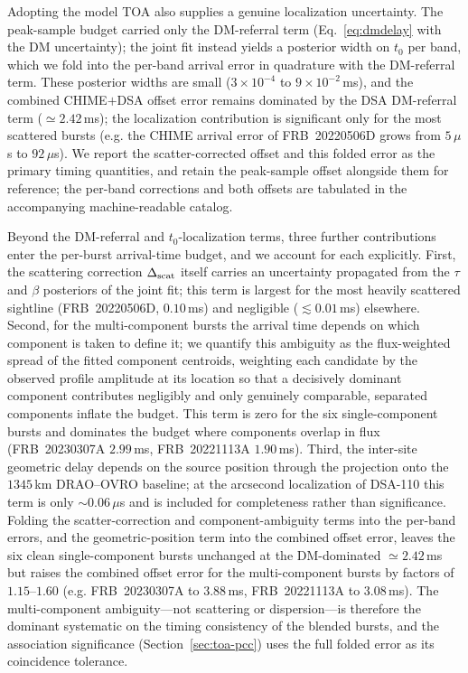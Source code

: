 Adopting the model TOA also supplies a genuine localization uncertainty. The
peak-sample budget carried only the DM-referral term
(Eq.~\ref{eq:dmdelay} with the DM uncertainty); the joint fit instead yields a
posterior width on $t_0$ per band, which we fold into the per-band arrival error
in quadrature with the DM-referral term. These posterior widths are small
($3\times10^{-4}$ to $9\times10^{-2}$\,ms), and the combined CHIME$+$DSA offset
error remains dominated by the DSA DM-referral term ($\simeq2.42$\,ms); the
localization contribution is significant only for the most scattered bursts
(e.g. the CHIME arrival error of FRB~20220506D grows from $5\,\mu$s to
$92\,\mu$s). We report the scatter-corrected offset and this folded error as
the primary timing quantities, and retain the peak-sample offset alongside them
for reference; the per-band corrections and both offsets are tabulated in the
accompanying machine-readable catalog.

Beyond the DM-referral and $t_0$-localization terms, three further
contributions enter the per-burst arrival-time budget, and we account for each
explicitly. First, the scattering correction $\Delta_{\rm scat}$ itself carries
an uncertainty propagated from the $\tau$ and $\beta$ posteriors of the joint
fit; this term is largest for the most heavily scattered sightline
(FRB~20220506D, $0.10$\,ms) and negligible ($\lesssim0.01$\,ms) elsewhere.
Second, for the multi-component bursts the arrival time depends on which
component is taken to define it; we quantify this ambiguity as the flux-weighted
spread of the fitted component centroids, weighting each candidate by the
observed profile amplitude at its location so that a decisively dominant
component contributes negligibly and only genuinely comparable, separated
components inflate the budget. This term is zero for the six single-component
bursts and dominates the budget where components overlap in flux
(FRB~20230307A $2.99$\,ms, FRB~20221113A $1.90$\,ms). Third, the inter-site
geometric delay depends on the source position through the projection onto the
$1345$\,km DRAO--OVRO baseline; at the arcsecond localization of DSA-110 this
term is only $\sim0.06\,\mu$s and is included for completeness rather than
significance. Folding the scatter-correction and component-ambiguity terms into
the per-band errors, and the geometric-position term into the combined offset
error, leaves the six clean single-component bursts unchanged at the
DM-dominated $\simeq2.42$\,ms but raises the combined offset error for the
multi-component bursts by factors of $1.15$--$1.60$ (e.g. FRB~20230307A to
$3.88$\,ms, FRB~20221113A to $3.08$\,ms). The multi-component ambiguity---not
scattering or dispersion---is therefore the dominant systematic on the timing
consistency of the blended bursts, and the association significance
(Section~\ref{sec:toa-pcc}) uses the full folded error as its coincidence
tolerance.

